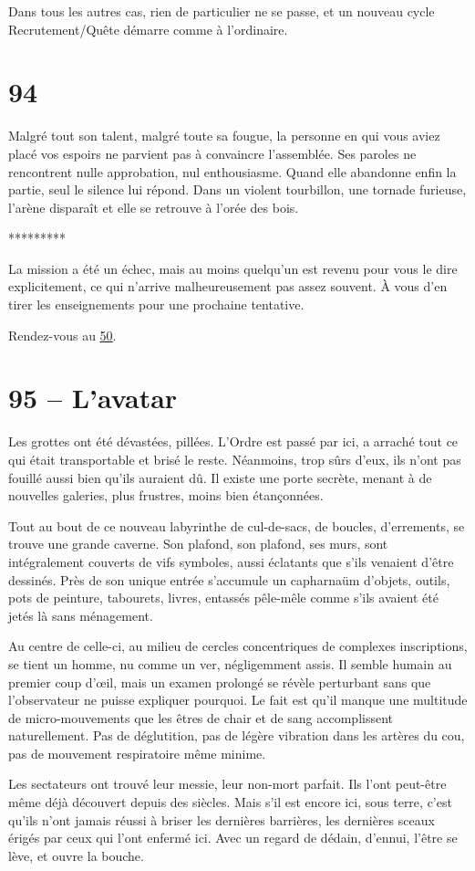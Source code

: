 \documentclass{report}
\newcommand{\gsection}[1]{
    \section{#1}
    \label{section-#1}
}
\newcommand{\glink}[1]{\hyperref[section-#1]{#1}}
\newcommand{\ellipse}{
    \begin{center}
        *********
    \end{center}
}
\begin{document}
Dans tous les autres cas, rien de particulier ne se passe, et un nouveau cycle Recrutement/Quête démarre comme à l'ordinaire.

\gsection{94}

Malgré tout son talent, malgré toute sa fougue, la personne en qui vous aviez placé vos espoirs ne parvient pas à convaincre l'assemblée. Ses paroles ne rencontrent nulle approbation, nul enthousiasme. Quand elle abandonne enfin la partie, seul le silence lui répond. Dans un violent tourbillon, une tornade furieuse, l'arène disparaît et elle se retrouve à l'orée des bois.

\ellipse

La mission a été un échec, mais au moins quelqu'un est revenu pour vous le dire explicitement, ce qui n'arrive malheureusement pas assez souvent. À vous d'en tirer les enseignements pour une prochaine tentative.

Rendez-vous au \glink{50}.

\gsection{95 – L'avatar}

Les grottes ont été dévastées, pillées. L'Ordre est passé par ici, a arraché tout ce qui était transportable et brisé le reste. Néanmoins, trop sûrs d'eux, ils n'ont pas fouillé aussi bien qu'ils auraient dû. Il existe une porte secrète, menant à de nouvelles galeries, plus frustres, moins bien étançonnées.

Tout au bout de ce nouveau labyrinthe de cul-de-sacs, de boucles, d'errements, se trouve une grande caverne. Son plafond, son plafond, ses murs, sont intégralement couverts de vifs symboles, aussi éclatants que s'ils venaient d'être dessinés. Près de son unique entrée s'accumule un capharnaüm d'objets, outils, pots de peinture, tabourets, livres, entassés pêle-mêle comme s'ils avaient été jetés là sans ménagement.

Au centre de celle-ci, au milieu de cercles concentriques de complexes inscriptions, se tient un homme, nu comme un ver, négligemment assis. Il semble humain au premier coup d’œil, mais un examen prolongé se révèle perturbant sans que l'observateur ne puisse expliquer pourquoi. Le fait est qu'il manque une multitude de micro-mouvements que les êtres de chair et de sang accomplissent naturellement. Pas de déglutition, pas de légère vibration dans les artères du cou, pas de mouvement respiratoire même minime.

Les sectateurs ont trouvé leur messie, leur non-mort parfait. Ils l'ont peut-être même déjà découvert depuis des siècles. Mais s'il est encore ici, sous terre, c'est qu'ils n'ont jamais réussi à briser les dernières barrières, les dernières sceaux érigés par ceux qui l'ont enfermé ici.
Avec un regard de dédain, d'ennui, l'être se lève, et ouvre la bouche.
\end{document}
